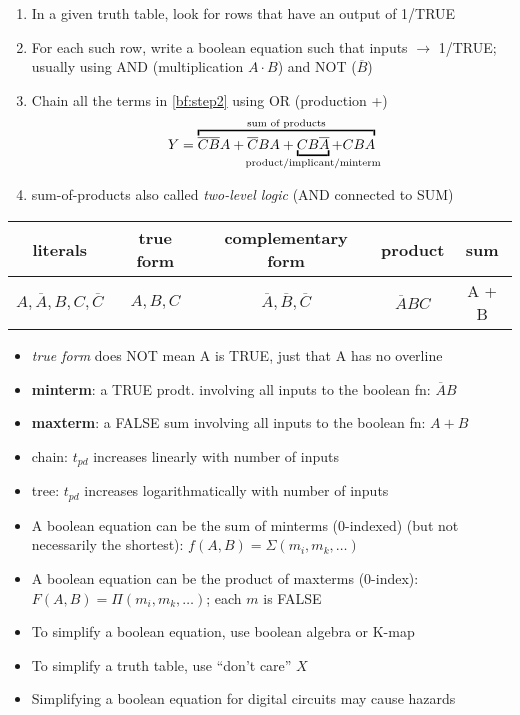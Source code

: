 \begin{enumerate}
\item In a given truth table, look for rows that have an output of 1/TRUE
\item\label{bf:step2} For each such row, write a boolean equation such that inputs $\rightarrow$ 1/TRUE; usually using AND (multiplication $A\cdot B$) and NOT ($\overline{B}$)
\item Chain all the terms in \ref{bf:step2} using OR (production +)
  \begin{equation}\label{eq:fnspec1}
Y = \overbracket{\overline{C}\overline{B}A + \overline{C}BA + \underbracket{CB\overline{A}}_{\mathclap{\text{product/implicant/minterm}}} + CBA}^{\text{sum of products}}
  \end{equation}
\item sum-of-products also called \emph{two-level logic} (AND connected to SUM)
\end{enumerate}
\begin{tabular}[h]{ccccc}
  \hline
  literals & true form & complementary form & product & sum \\
  \hline
  $A, \overline{A}, B, C, \overline{C}$ & $A, B, C$ & $\overline{A}, \overline{B}, \overline{C}$ & $\overline{A}BC$ & A + B \\
  \hline
\end{tabular}
\begin{itemize}
\item[] \emph{true form} does NOT mean A is TRUE, just that A has no overline
\item \textbf{minterm}: a TRUE prodt. involving all inputs to the boolean fn: $\overline{A}B$
\item \textbf{maxterm}: a FALSE sum involving all inputs to the boolean fn: $A + B$
\item chain: $t_{pd}$ increases linearly with number of inputs
\item tree: $t_{pd}$ increases logarithmatically with number of inputs
\item A boolean equation can be the sum of minterms (0-indexed) (but not necessarily the shortest): $f(A,B) = \Sigma(m_{i},m_{k},\ldots)$
\item A boolean equation can be the product of maxterms (0-index): $F(A,B) = \Pi(m_{i},m_{k},\ldots)$; each $m$ is FALSE
\item To simplify a boolean equation, use boolean algebra or K-map
\item To simplify a truth table, use ``don't care'' $X$
\item Simplifying a boolean equation for digital circuits may cause hazards
\end{itemize}
